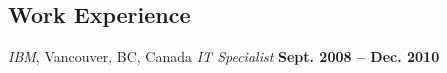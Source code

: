 \documentclass[margin,line,letterpaper]{resume}
\begin{document}
\begin{resume}
    \section{\mysidestyle Work Experience}

    \textsl{IBM}, Vancouver, BC, Canada
    \textsl{IT Specialist} \hfill \textbf{Sept. 2008 -- Dec. 2010}





\end{resume}
\end{document}
